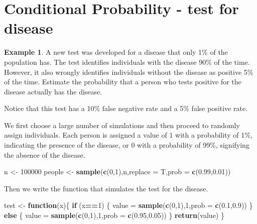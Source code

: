 \documentclass[
]{book}
\newenvironment{Shaded}{\begin{snugshade}}{\end{snugshade}}
\newcommand{\AttributeTok}[1]{\textcolor[rgb]{0.13,0.29,0.53}{#1}}
\newcommand{\ControlFlowTok}[1]{\textcolor[rgb]{0.13,0.29,0.53}{\textbf{#1}}}
\newcommand{\DecValTok}[1]{\textcolor[rgb]{0.00,0.00,0.81}{#1}}
\newcommand{\FloatTok}[1]{\textcolor[rgb]{0.00,0.00,0.81}{#1}}
\newcommand{\FunctionTok}[1]{\textcolor[rgb]{0.13,0.29,0.53}{\textbf{#1}}}
\newcommand{\NormalTok}[1]{#1}
\newcommand{\OtherTok}[1]{\textcolor[rgb]{0.56,0.35,0.01}{#1}}
\newcommand{\SpecialCharTok}[1]{\textcolor[rgb]{0.81,0.36,0.00}{\textbf{#1}}}
\theoremstyle{definition}
\theoremstyle{definition}
\newtheorem{example}{Example}[chapter]
\theoremstyle{definition}
\theoremstyle{definition}
\theoremstyle{remark}
\begin{document}
\hypertarget{conditional-probability-test}{%
\section{Conditional Probability - test for disease}\label{conditional-probability-test}}

\begin{example}
A new test was developed for a disease that only 1\% of the population has. The test identifies individuals with the disease 90\% of the time. However, it also wrongly identifies individuals without the disease as positive 5\% of the time. Estimate the probability that a person who tests positive for the disease actually has the disease.
\end{example}

Notice that this test has a 10\% false negative rate and a 5\% false positive rate.

We first choose a large number of simulations and then proceed to randomly assign individuals. Each person is assigned a value of 1 with a probability of 1\%, indicating the presence of the disease, or 0 with a probability of 99\%, signifying the absence of the disease.

\begin{Shaded}
\begin{Highlighting}[]
\NormalTok{n }\OtherTok{\textless{}{-}} \DecValTok{100000}
\NormalTok{people }\OtherTok{\textless{}{-}} \FunctionTok{sample}\NormalTok{(}\FunctionTok{c}\NormalTok{(}\DecValTok{0}\NormalTok{,}\DecValTok{1}\NormalTok{),n,}\AttributeTok{replace =}\NormalTok{ T,}\AttributeTok{prob =} \FunctionTok{c}\NormalTok{(}\FloatTok{0.99}\NormalTok{,}\FloatTok{0.01}\NormalTok{)) }
\end{Highlighting}
\end{Shaded}

Then we write the function that simulates the test for the disease.

\begin{Shaded}
\begin{Highlighting}[]
\NormalTok{test }\OtherTok{\textless{}{-}} \ControlFlowTok{function}\NormalTok{(x)\{}
  \ControlFlowTok{if}\NormalTok{ (x}\SpecialCharTok{==}\DecValTok{1}\NormalTok{) \{}
\NormalTok{    value }\OtherTok{=} \FunctionTok{sample}\NormalTok{(}\FunctionTok{c}\NormalTok{(}\DecValTok{0}\NormalTok{,}\DecValTok{1}\NormalTok{),}\DecValTok{1}\NormalTok{,}\AttributeTok{prob =} \FunctionTok{c}\NormalTok{(}\FloatTok{0.1}\NormalTok{,}\FloatTok{0.9}\NormalTok{))}
\NormalTok{  \} }\ControlFlowTok{else}\NormalTok{ \{}
\NormalTok{    value }\OtherTok{=} \FunctionTok{sample}\NormalTok{(}\FunctionTok{c}\NormalTok{(}\DecValTok{0}\NormalTok{,}\DecValTok{1}\NormalTok{),}\DecValTok{1}\NormalTok{,}\AttributeTok{prob =} \FunctionTok{c}\NormalTok{(}\FloatTok{0.95}\NormalTok{,}\FloatTok{0.05}\NormalTok{))}
\NormalTok{  \}}
  \FunctionTok{return}\NormalTok{(value)}
\NormalTok{\}}
\end{Highlighting}
\end{Shaded}
\end{document}
